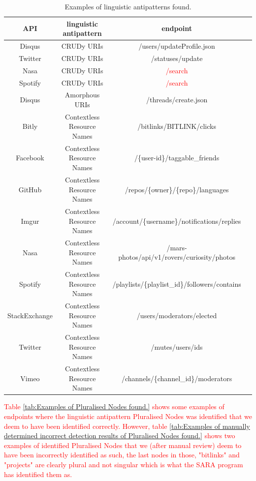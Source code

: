 \begin{table}[htb!]
    \centering
    \begin{tabular}{|c|c|c|c|}
        \hline
        API & linguistic antipattern & endpoint \\ \hline
        Disqus & CRUDy URIs & /users/updateProfile.json \\  \hline
        Twitter & CRUDy URIs & /statuses/update \\ \hline
        Nasa & CRUDy URIs & \textcolor{red}{/search} \\  \hline
        Spotify & CRUDy URIs & \textcolor{red}{/search} \\  \hline
        Disqus & Amorphous URIs & /threads/create.json \\ \hline
        Bitly & Contextless Resource Names & /bitlinks/{BITLINK}/clicks \\ \hline
        Facebook & Contextless Resource Names & /\{user-id\}/taggable\_friends \\ \hline
        GitHub & Contextless Resource Names & /repos/\{owner\}/\{repo\}/languages \\ \hline
        Imgur & Contextless Resource Names & /account/\{username\}/notifications/replies \\ \hline
        Nasa & Contextless Resource Names & /mars-photos/api/v1/rovers/curiosity/photos \\ \hline
        Spotify & Contextless Resource Names &
        /playlists/\{playlist\_id\}/followers/contains \\ \hline
        StackExchange & Contextless Resource Names & /users/moderators/elected \\ \hline
        Twitter & Contextless Resource Names & /mutes/users/ids \\ \hline
        Vimeo & Contextless Resource Names &
        /channels/\{channel\_id\}/moderators \\ \hline
    \end{tabular}
    \caption{Examples of linguistic antipatterns found.}
    \label{tab:Examples of linguistic antipatterns found.}
\end{table}

\textcolor{red}{
Table \ref{tab:Examples of Pluralised Nodes found.} shows some examples of endpoints where the linguistic antipattern Pluralised Nodes was identified that we deem to have been identified correctly. However, table \ref{tab:Examples of manually determined incorrect detection results of Pluralised Nodes found.} shows two examples of identified Pluralised Nodes that we (after manual review) deem to have been incorrectly identified as such, the last nodes in those, "bitlinks" and "projects" are clearly plural and not singular which is what the SARA program has identified them as.
}

